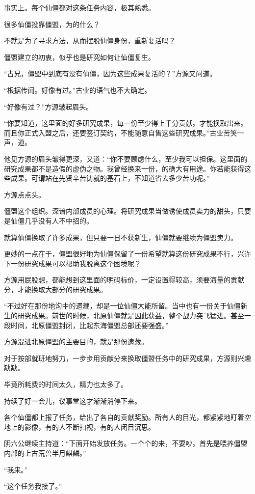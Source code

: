 \begin{this_body}
事实上。每个仙僵都对这条任务内容，极其熟悉。

很多仙僵投靠僵盟，为的什么？

不就是为了寻求方法，从而摆脱仙僵身份，重新复活吗？

僵盟建立的初衷，似乎也是研究如何让仙僵复生。

“古兄，僵盟中到底有没有仙僵，因为这些成果复活的？”方源又问道。

“根据传闻。好像有过。”古业的语气也不大确定。

“好像有过？”方源皱起眉头。

“你要知道，这里面的好多研究成果，每一份至少得上千分贡献。才能换取出来。而且你正式入盟之后，还要签订契约，不能随意自售这些研究成果。”古业苦笑一声，道。

他见方源的眉头皱得更深，又道：“你不要顾虑什么，至少我可以担保。这里面的研究成果都不是造假的虚伪之物。我曾经换来一份，的确大有用途。你若能获得这些成果。可谓站在先贤辛苦铸就的基石上，不知道省去多少苦功呢。”

方源点点头。

僵盟这个组织。深谙内部成员的心理。将研究成果当做诱使成员卖力的甜头，只要是仙僵几乎没有人不中招的。

就算仙僵换取了许多成果，但只要一日不获新生，仙僵就要继续为僵盟卖力。

更妙的一点在于，僵盟很好地为仙僵保留了一份希望就算这份研究成果不行，兴许下一份研究成果可以帮助我脱离这个困境呢？

方源用屁股想，都能想到这里面的明码标价，一定设置得较高，须要海量的贡献分，才能换取大部分的研究成果。

“不过好在那份地沟中的遗藏，却是一位仙僵大能所留。当中也有一份关于仙僵新生的研究成果。前世的时候，北原仙僵就是因此获益，整个战力突飞猛进。甚至一段时间，北原僵盟封闭，比起东海僵盟总部还要强盛。”

方源混进北原僵盟的主要目的，就是那份遗藏。

对于按部就班地努力，一步步用贡献分来换取僵盟任务中的研究成果，方源则兴趣缺缺。

毕竟所耗费的时间太久，精力也太多了。

持续了好一会儿，议事堂这才渐渐消停下来。

各个仙僵都上报了任务，给出了各自的贡献奖励。所有人的目光，都紧紧地盯着空地上的影像，有的人不断扫视，有的人闭目沉思。

阴六公继续主持道：“下面开始发放任务。一个个的来，不要吵。首先是喂养僵盟内部的上古荒兽半月麒麟。”

“我来。”

“这个任务我接了。”


\end{this_body}
